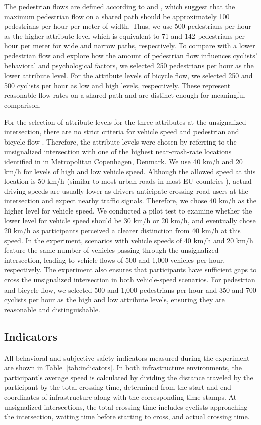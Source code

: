 \documentclass[3p,authoryear]{elsarticle}
\begin{document}
The pedestrian flows are defined according to \citet{cyclenation2014} and
\citet{skoczynski2021analysis}, which suggest that the maximum pedestrian flow
on a shared path should be approximately 100 pedestrians per hour per meter of
width. Thus, we use 500 pedestrians per hour as the higher attribute level which
is equivalent to 71 and 142 pedestrians per hour per meter for wide and narrow
paths, respectively. To compare with a lower pedestrian flow and explore how the
amount of pedestrian flow influences cyclists' behavioral and psychological
factors, we selected 250 pedestrians per hour as the lower attribute level. For
the attribute levels of bicycle flow, we selected 250 and 500 cyclists per hour
as low and high levels, respectively. These represent reasonable flow rates on a
shared path and are distinct enough for meaningful comparison.

For the selection of attribute levels for the three attributes at the
unsignalized intersection, there are no strict criteria for vehicle speed and
pedestrian and bicycle flow \citep{andersen2012collection,jensen2012pedestrian}.
Therefore, the attribute levels were chosen by referring to the unsignalized
intersection with one of the highest near-crash-rate locations identified in
\citet{chou2024comparative} in Metropolitan Copenhagen, Denmark. We use 40 km/h
and 20 km/h for levels of high and low vehicle speed. Although the allowed speed
at this location is 50 km/h (similar to most urban roads in most EU countries
\citep{ec2024speed}), actual driving speeds are usually lower as drivers
anticipate crossing road users at the intersection and expect nearby traffic
signals. Therefore, we chose 40 km/h as the higher level for vehicle speed. We
conducted a pilot test to examine whether the lower level for vehicle speed
should be 30 km/h or 20 km/h, and eventually chose 20 km/h as participants
perceived a clearer distinction from 40 km/h at this speed. In the experiment,
scenarios with vehicle speeds of 40 km/h and 20 km/h feature the same number of
vehicles passing through the unsignalized intersection, leading to vehicle flows
of 500 and 1,000 vehicles per hour, respectively. The experiment also ensures
that participants have sufficient gaps to cross the unsignalized intersection in
both vehicle-speed scenarios. For pedestrian and bicycle flow, we selected 500
and 1,000 pedestrians per hour and 350 and 700 cyclists per hour as the high and
low attribute levels, ensuring they are reasonable and distinguishable.

\subsection{Indicators}
All behavioral and subjective safety indicators measured during the experiment
are shown in Table~\ref{tab:indicators}. In both infrastructure environments,
the participant's average speed is calculated by dividing the distance traveled
by the participant by the total crossing time, determined from the start and end
coordinates of infrastructure along with the corresponding time stamps. At
unsignalized intersections, the total crossing time includes cyclists
approaching the intersection, waiting time before starting to cross, and actual
crossing time.
\end{document}
